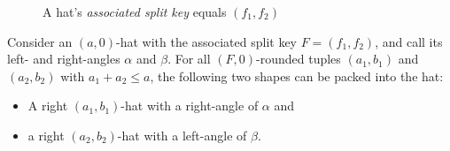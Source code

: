 \documentclass[a4paper,style=print,bibliography=totoc,nexus,lnum,extramargin]{tubsbook}
\begin{document}
\begin{figure}[htbp!]
    \centering


    \caption{A hat's \emph{associated split key} equals $(f_1, f_2)$}
    \label{fig:hatf}
\end{figure}


\begin{lemma}\label{th:hatsinhat}
    Consider an $(a,0)$-hat with the associated split key $F = (f_1, f_2)$, and call its left- and right-angles $\alpha$ and $\beta$.
    For all $(F,0)$-rounded tuples $(a_1, b_1)$ and $(a_2, b_2)$ with $a_1 + a_2 \le a$, the following two shapes can be packed into the hat:
    \begin{itemize}
        \item A right $(a_1,b_1)$-hat with a right-angle of $\alpha$ and
        \item a right $(a_2,b_2)$-hat with a left-angle of $\beta$.
    \end{itemize}
\end{lemma}
\end{document}
